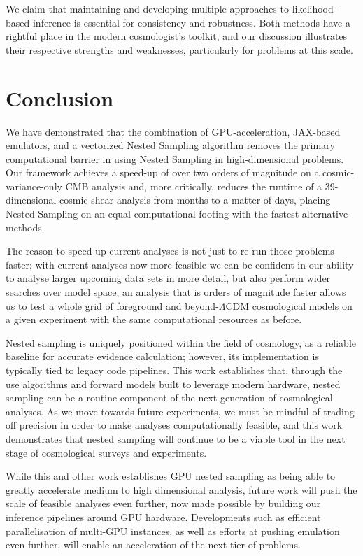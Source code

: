 \documentclass[twocolumn]{openjournal}
\begin{document}
We claim that maintaining and developing multiple approaches to likelihood-based inference is essential for consistency and robustness. Both methods have a rightful place in the modern cosmologist’s toolkit, and our discussion illustrates their respective strengths and weaknesses, particularly for problems at this scale.

\section{Conclusion}

We have demonstrated that the combination of GPU-acceleration, JAX-based emulators, and a vectorized Nested Sampling algorithm removes the primary computational barrier in using Nested Sampling in high-dimensional problems. Our framework achieves a speed-up of over two orders of magnitude on a cosmic-variance-only CMB analysis and, more critically, reduces the runtime of a 39-dimensional cosmic shear analysis from months to a matter of days, placing Nested Sampling on an equal computational footing with the fastest alternative methods.

The reason to speed-up current analyses is not just to re-run those problems faster; with current analyses now more feasible we can be confident in our ability to analyse larger upcoming data sets in more detail, but also perform wider searches over model space; an analysis that is orders of magnitude faster allows us to test a whole grid of foreground and beyond-$\Lambda$CDM cosmological models on a given experiment with the same computational resources as before.

Nested sampling is uniquely positioned within the field of cosmology, as a reliable baseline for accurate evidence calculation; however, its implementation is typically tied to legacy code pipelines. This work establishes that, through the use algorithms and forward models built to leverage modern hardware, nested sampling can be a routine component of the next generation of cosmological analyses. As we move towards future experiments, we must be mindful of trading off precision in order to make analyses computationally feasible, and this work demonstrates that nested sampling will continue to be a viable tool in the next stage of cosmological surveys and experiments.

While this and other work \citep{NSSyallup,metha} establishes GPU nested sampling as being able to greatly accelerate medium to high dimensional analysis, future work will push the scale of feasible analyses even further, now made possible by building our inference pipelines around GPU hardware. Developments such as efficient parallelisation of multi-GPU instances, as well as efforts at pushing emulation even further, will enable an acceleration of the next tier of problems.
\end{document}
